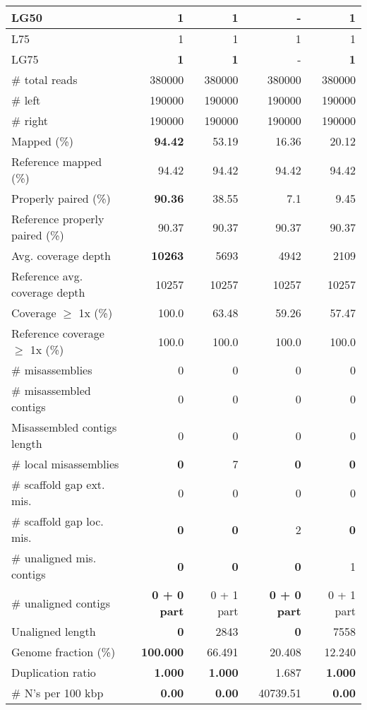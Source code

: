 \documentclass[12pt,a4paper]{article}
\begin{document}
\begin{table}[ht]
\begin{center}
\begin{tabular}{|l*{4}{|r}|}
LG50 & {\bf 1} & {\bf 1} & - & {\bf 1} \\ \hline
L75 & 1 & 1 & 1 & 1 \\ \hline
LG75 & {\bf 1} & {\bf 1} & - & {\bf 1} \\ \hline
\# total reads & 380000 & 380000 & 380000 & 380000 \\ \hline
\# left & 190000 & 190000 & 190000 & 190000 \\ \hline
\# right & 190000 & 190000 & 190000 & 190000 \\ \hline
Mapped (\%) & {\bf 94.42} & 53.19 & 16.36 & 20.12 \\ \hline
Reference mapped (\%) & 94.42 & 94.42 & 94.42 & 94.42 \\ \hline
Properly paired (\%) & {\bf 90.36} & 38.55 & 7.1 & 9.45 \\ \hline
Reference properly paired (\%) & 90.37 & 90.37 & 90.37 & 90.37 \\ \hline
Avg. coverage depth & {\bf 10263} & 5693 & 4942 & 2109 \\ \hline
Reference avg. coverage depth & 10257 & 10257 & 10257 & 10257 \\ \hline
Coverage $\geq$ 1x (\%) & 100.0 & 63.48 & 59.26 & 57.47 \\ \hline
Reference coverage $\geq$ 1x (\%) & 100.0 & 100.0 & 100.0 & 100.0 \\ \hline
\# misassemblies & 0 & 0 & 0 & 0 \\ \hline
\# misassembled contigs & 0 & 0 & 0 & 0 \\ \hline
Misassembled contigs length & 0 & 0 & 0 & 0 \\ \hline
\# local misassemblies & {\bf 0} & 7 & {\bf 0} & {\bf 0} \\ \hline
\# scaffold gap ext. mis. & 0 & 0 & 0 & 0 \\ \hline
\# scaffold gap loc. mis. & {\bf 0} & {\bf 0} & 2 & {\bf 0} \\ \hline
\# unaligned mis. contigs & {\bf 0} & {\bf 0} & {\bf 0} & 1 \\ \hline
\# unaligned contigs & {\bf 0 + 0 part} & 0 + 1 part & {\bf 0 + 0 part} & 0 + 1 part \\ \hline
Unaligned length & {\bf 0} & 2843 & {\bf 0} & 7558 \\ \hline
Genome fraction (\%) & {\bf 100.000} & 66.491 & 20.408 & 12.240 \\ \hline
Duplication ratio & {\bf 1.000} & {\bf 1.000} & 1.687 & {\bf 1.000} \\ \hline
\# N's per 100 kbp & {\bf 0.00} & {\bf 0.00} & 40739.51 & {\bf 0.00} \\ \hline

\end{tabular}
\end{center}
\end{table}
\end{document}
